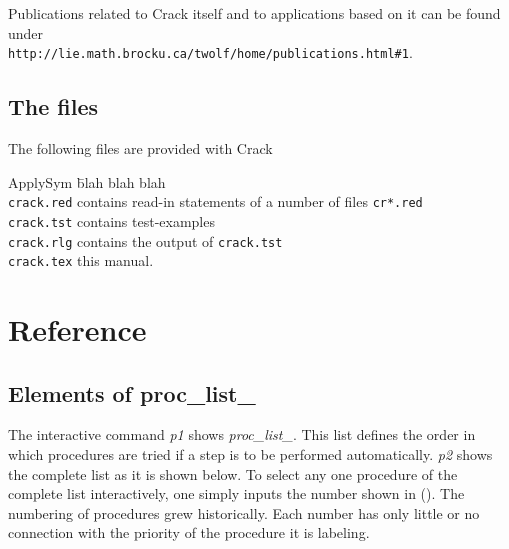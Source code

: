 \documentclass[12pt]{article}
\makeatletter
\def\dest#1{\hbox{\raise14pt\hbox{\special{pdf:dest (#1) [ @thispage /FitH
@ypos ]}}}}%
\makeatother
\begin{document}
Publications related to {\sc Crack} itself and to applications based
on it can be found under  \\
\verb+http://lie.math.brocku.ca/twolf/home/publications.html#1+.

\subsection{The files}
The following files are provided with {\sc Crack}
\begin{tabbing}
{\sc ApplySym} \= blah blah blah \kill \\
{\tt crack.red} \> contains read-in statements of a number
                      of files {\tt cr*.red} \\
{\tt crack.tst} \> contains test-examples \\
{\tt crack.rlg} \>contains the output of {\tt crack.tst} \\
{\tt crack.tex} \> this manual.
\end{tabbing}

\section{Reference}
\subsection{Elements of proc\_list\_}
The interactive command {\em p1} shows {\em proc\_list\_}. This list
defines the order in which procedures are tried if a
step is to be performed automatically. {\em p2} shows the complete
list as it is shown below. To select any one procedure of the complete
list interactively, one simply inputs the number shown in ().
The numbering of procedures grew historically. 
Each number has only little or no connection with the priority of the
procedure it is labeling.
\end{document}
